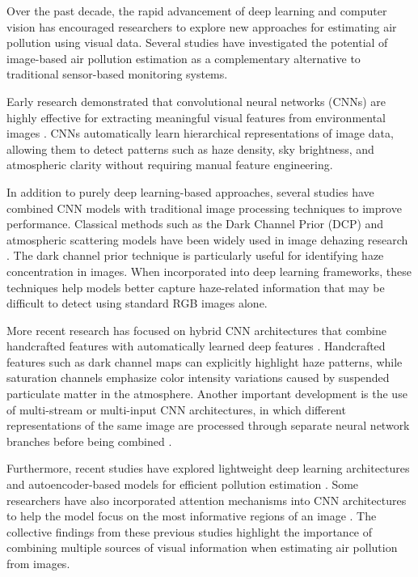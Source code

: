 \documentclass[conference]{IEEEtran}
\begin{document}
Over the past decade, the rapid advancement of deep learning and computer
vision has encouraged researchers to explore new approaches for estimating air
pollution using visual data. Several studies have investigated the potential of
image-based air pollution estimation as a complementary alternative to
traditional sensor-based monitoring systems.

Early research demonstrated that convolutional neural networks (CNNs) are
highly effective for extracting meaningful visual features from environmental
images \cite{chakma2020}. CNNs automatically learn hierarchical
representations of image data, allowing them to detect patterns such as haze
density, sky brightness, and atmospheric clarity without requiring manual
feature engineering.

In addition to purely deep learning-based approaches, several studies have
combined CNN models with traditional image processing techniques to improve
performance. Classical methods such as the Dark Channel Prior (DCP) and
atmospheric scattering models have been widely used in image dehazing research
\cite{ma2019}. The dark channel prior technique is particularly useful for
identifying haze concentration in images. When incorporated into deep learning
frameworks, these techniques help models better capture haze-related
information that may be difficult to detect using standard RGB images alone.

More recent research has focused on hybrid CNN architectures that combine
handcrafted features with automatically learned deep features \cite{zhang2021}.
Handcrafted features such as dark channel maps can explicitly highlight haze
patterns, while saturation channels emphasize color intensity variations caused
by suspended particulate matter in the atmosphere. Another important
development is the use of multi-stream or multi-input CNN architectures, in
which different representations of the same image are processed through
separate neural network branches before being combined \cite{chen2022}.

Furthermore, recent studies have explored lightweight deep learning
architectures and autoencoder-based models for efficient pollution estimation
\cite{zhang2021}. Some researchers have also incorporated attention mechanisms
into CNN architectures to help the model focus on the most informative regions
of an image \cite{chen2022}. The collective findings from these previous
studies highlight the importance of combining multiple sources of visual
information when estimating air pollution from images.
\end{document}
